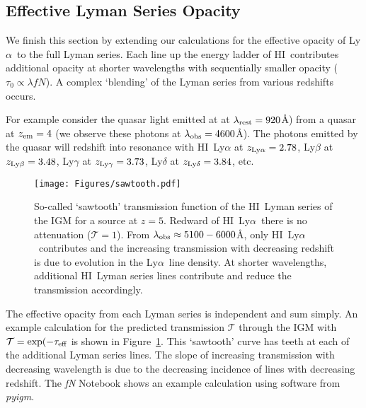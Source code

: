 \documentclass[graybox]{svmult}
\newcommand{\HI}{H{\sc I}}
\def\lya{Ly$\alpha$}
\begin{document}
\subsection{Effective Lyman Series Opacity}
We finish this section by extending our calculations
for the effective opacity of \lya\ to the full
Lyman series.  Each line up the energy ladder of \HI\
contributes additional opacity at shorter
wavelengths with sequentially smaller opacity
($\tau_0 \propto \lambda f N$).
A complex `blending' of the Lyman series
from various redshifts occurs.  

For example
consider the quasar light emitted at 
at $\lambda_{\rm rest} = 920$\AA) 
from a quasar at $z_{\rm em} = 4$
(we observe these photons at $\lambda_{\rm obs} = 4600$\AA).
The photons emitted by the quasar will redshift into
resonance with 
\HI\ Ly$\alpha$ at $z_{\rm Ly\alpha} = 2.78$,
Ly$\beta$ at $z_{\rm Ly\beta} = 3.48$,
Ly$\gamma$ at $z_{\rm Ly\gamma} = 3.73$,
Ly$\delta$ at $z_{\rm Ly\delta} = 3.84$, etc.

%
\begin{figure}[b]
\sidecaption
\texttt{[image: Figures/sawtooth.pdf]}
%
%
\caption{So-called `sawtooth' transmission function of the
\HI\ Lyman series of the IGM for a source at $z=5$.
Redward of \HI\ \lya\ there is no attenuation
($\mathcal{T} = 1$).  From $\lambda_{\rm obs} \approx 5100-6000$\AA,
only \HI\ \lya\ contributes and the increasing transmission
with decreasing redshift is due to evolution in the \lya\ line density.
At shorter wavelengths, additional \HI\ Lyman series lines
contribute and reduce the transmission accordingly.
}
\label{fig:sawtooth}       %
\end{figure}

The effective opacity from each Lyman series is independent
and sum simply.  An example calculation for the
predicted transmission $\mathcal{T}$ through the IGM
with $\mathcal{T} = \exp(-\tau_{\rm eff}$ is
shown in Figure~\ref{fig:sawtooth}.
This `sawtooth' curve has teeth at each of the additional
Lyman series lines.  The slope of increasing transmission
with decreasing wavelength is due to the decreasing 
incidence of lines with decreasing redshift.
The {\it fN} Notebook shows an example calculation using
software from {\it pyigm}.
\end{document}
